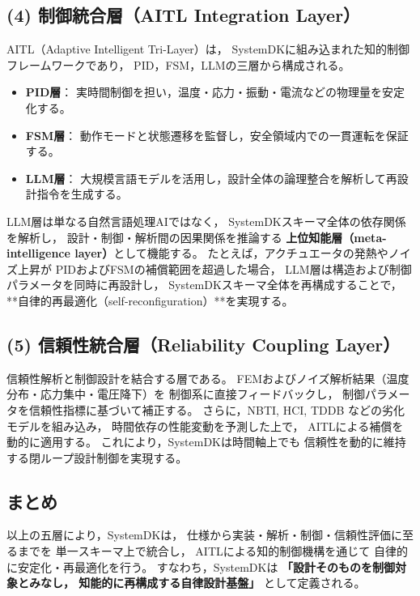 \subsection{(4) 制御統合層（AITL Integration Layer）}
AITL（Adaptive Intelligent Tri-Layer）は，
SystemDKに組み込まれた知的制御フレームワークであり，
PID，FSM，LLMの三層から構成される。

\begin{itemize}
  \item \textbf{PID層}： 実時間制御を担い，温度・応力・振動・電流などの物理量を安定化する。
  \item \textbf{FSM層}： 動作モードと状態遷移を監督し，安全領域内での一貫運転を保証する。
  \item \textbf{LLM層}： 大規模言語モデルを活用し，設計全体の論理整合を解析して再設計指令を生成する。
\end{itemize}

LLM層は単なる自然言語処理AIではなく，
SystemDKスキーマ全体の依存関係を解析し，
設計・制御・解析間の因果関係を推論する
\textbf{上位知能層（meta-intelligence layer）}として機能する。
たとえば，アクチュエータの発熱やノイズ上昇が
PIDおよびFSMの補償範囲を超過した場合，
LLM層は構造および制御パラメータを同時に再設計し，
SystemDKスキーマ全体を再構成することで，
**自律的再最適化（self-reconfiguration）**を実現する。

\subsection{(5) 信頼性統合層（Reliability Coupling Layer）}
信頼性解析と制御設計を結合する層である。
FEMおよびノイズ解析結果（温度分布・応力集中・電圧降下）を
制御系に直接フィードバックし，
制御パラメータを信頼性指標に基づいて補正する。
さらに，NBTI, HCI, TDDB などの劣化モデルを組み込み，
時間依存の性能変動を予測した上で，
AITLによる補償を動的に適用する。
これにより，SystemDKは時間軸上でも
信頼性を動的に維持する閉ループ設計制御を実現する。

\subsection*{まとめ}
以上の五層により，SystemDKは，
仕様から実装・解析・制御・信頼性評価に至るまでを
単一スキーマ上で統合し，
AITLによる知的制御機構を通じて
自律的に安定化・再最適化を行う。
すなわち，SystemDKは
\textbf{「設計そのものを制御対象とみなし，
知能的に再構成する自律設計基盤」}
として定義される。
